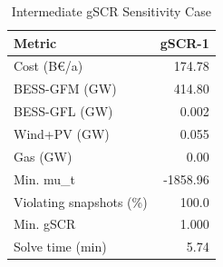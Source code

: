 \begin{table}[!t]\centering
\caption{Intermediate gSCR Sensitivity Case}
\begin{tabular}{lr}\toprule Metric & gSCR-1 \\ \midrule
Cost (B€/a) & 174.78 \\
BESS-GFM (GW) & 414.80 \\
BESS-GFL (GW) & 0.002 \\
Wind+PV (GW) & 0.055 \\
Gas (GW) & 0.00 \\
Min. mu\_t & -1858.96 \\
Violating snapshots (\%) & 100.0 \\
Min. gSCR & 1.000 \\
Solve time (min) & 5.74 \\
\bottomrule\end{tabular}\end{table}
